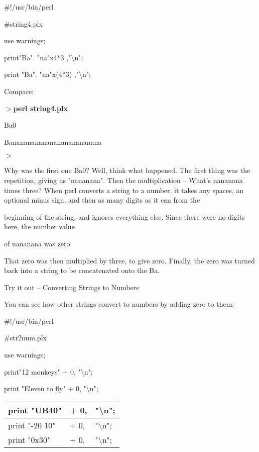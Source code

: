\documentclass[a4paper,11pt]{book}
\begin{document}
\noindent 

\noindent \#!/usr/bin/perl

\noindent \#string4.plx

\noindent use warnings;

\noindent print"Ba". "na"x4*3 ,"\textbackslash n";

\noindent print "Ba". "na"x(4*3) ,"\textbackslash n";

\noindent 

\noindent Compare:

\noindent 

\noindent $>$\textbf{perl string4.plx}

\noindent Ba0

\noindent Banananananananananananana

\noindent $>$

\noindent 

\noindent Why was the first one Ba0? Well, think what happened. The first thing was the repetition, giving us "nananana". Then the multiplication -- What's nananana times three? When perl converts a string to a number, it takes any spaces, an optional minus sign, and then as many digits as it can from the

\noindent beginning of the string, and ignores everything else. Since there were no digits here, the number value

\noindent of nananana was zero.

\noindent 

\noindent That zero was then multiplied by three, to give zero. Finally, the zero was turned back into a string to be concatenated onto the Ba.

\noindent 

\noindent 

\noindent Try it out -- Converting Strings to Numbers

\noindent You can see how other strings convert to numbers by adding zero to them:

\noindent 

\noindent \#!/usr/bin/perl

\noindent \#str2num.plx

\noindent use warnings;

\noindent print"12 monkeys" + 0,  "\textbackslash n";

\noindent print "Eleven to fly" + 0,  "\textbackslash n";

\begin{tabular}{|p{1.3in}|p{0.4in}|p{2.5in}|} \hline 
print "UB40" & + 0, & "\textbackslash n"; \\ \hline 
print "-20 10" & + 0, & "\textbackslash n"; \\ \hline 
print "0x30" & + 0, & "\textbackslash n"; \\ \hline 
\end{tabular}
\end{document}
